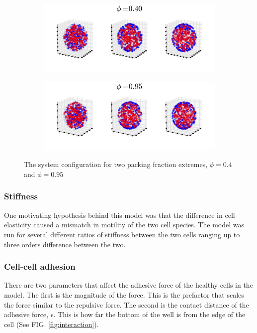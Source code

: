 \documentclass[aps,prb,twocolumn,groupedaddress,nofootinbib,floatfix]{revtex4}
\begin{document}
\begin{figure}
  \begin{subfigure}{\columnwidth}
    \includegraphics[width=1.0\columnwidth]{images/configs_40.png}
  \end{subfigure}
  \begin{subfigure}{\columnwidth}
    \includegraphics[width=1.0\columnwidth]{images/configs_95.png}
  \end{subfigure}
  \caption{The system configuration for two packing fraction extremes, $\phi=0.4$ and $\phi=0.95$}
  \label{fig:contact}
\end{figure}

\subsubsection{Stiffness}

One motivating hypothesis behind this model was that the difference in cell elasticity caused a mismatch in motility of the two cell species.
The model was run for several different ratios of stiffness between the two cells ranging up to three orders difference between the two.

\subsubsection{Cell-cell adhesion}

There are two parameters that affect the adhesive force of the healthy cells in the model.
The first is the magnitude of the force.
This is the prefactor that scales the force similar to the repulsive force.
The second is the contact distance of the adhesive force, $\epsilon$.
This is how far the bottom of the well is from the edge of the cell (See FIG. \ref{fig:interaction}).
\end{document}
